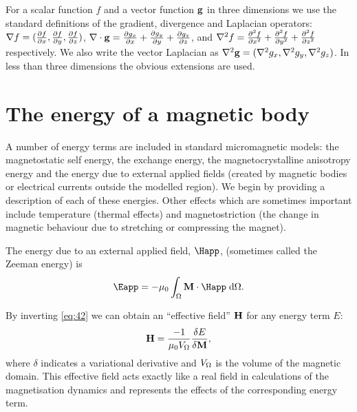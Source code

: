 For a scalar function $f$ and a vector function ${\boldsymbol{\mathrm{g}}}$ in three dimensions we use the standard definitions of the gradient, divergence and Laplacian operators: $\nabla f = (\frac{\partial f}{\partial x}, \frac{\partial f}{\partial y}, \frac{\partial f}{\partial z})$, $\nabla \cdot {\boldsymbol{\mathrm{g}}} = \frac{\partial g_x}{\partial x} + \frac{\partial g_y}{\partial y} + \frac{\partial g_z}{\partial z}$, and $\nabla^2 f = \frac{\partial^2 f}{\partial {x}^2} + \frac{\partial^2 f}{\partial {y}^2} + \frac{\partial^2 f}{\partial {z}^2}$ respectively.
We also write the vector Laplacian as $\nabla^2 {\boldsymbol{\mathrm{g}}} = (\nabla^2 g_x,\nabla^2 g_y, \nabla^2 g_z )$.
In less than three dimensions the obvious extensions are used.


\section{The energy of a magnetic body}
\label{sec:energy-magnetic-body}

A number of energy terms are included in standard micromagnetic models: the magnetostatic self energy, the exchange energy, the magnetocrystalline anisotropy energy and the energy due to external applied fields (created by magnetic bodies or electrical currents outside the modelled region).
We begin by providing a description of each of these energies.
Other effects which are sometimes important include temperature (thermal effects) and magnetostriction (the change in magnetic behaviour due to stretching or compressing the magnet).

The energy due to an external applied field, $\Happ$, (sometimes called the Zeeman energy) is
\begin{equation}
  \label{eq:42}
  \Eapp = - \mu_0 \int_{\magd} \Mv \cdot \Happ \d \magd.
\end{equation}


By inverting \cref{eq:42} we can obtain an ``effective field'' $\boldsymbol{\mathrm{H}}$ for any energy term $E$:
\begin{equation}
  \boldsymbol{\mathrm{H}} = \dfrac{-1}{\mu_0V_{\Omega}} \dfrac{\delta E}{\delta \boldsymbol{\mathrm{M}}},
  \label{eq:62}
\end{equation}
where $\delta$ indicates a variational derivative and $V_{\Omega}$ is the volume of the magnetic domain.
This effective field acts exactly like a real field in calculations of the magnetisation dynamics and represents the effects of the corresponding energy term.



